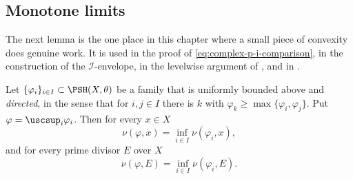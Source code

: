 \subsection{Monotone limits}
\label{sec:ch51-lelong-monotone}

The next lemma is the one place in this chapter where a small piece of
convexity does genuine work.  It is used in the proof of
\eqref{eq:complex-p-i-comparison}, in the construction of the
\(\mathcal I\)-envelope, in the levelwise argument of
, and in .

\begin{lemma}
\label{lem:ch51-lelong-increasing}
Let \(\{\varphi_i\}_{i\in I}\subset\PSH(X,\theta)\) be a family that is
uniformly bounded above and \emph{directed}, in the sense that for
\(i,j\in I\) there is \(k\) with \(\varphi_k\geq\max\{\varphi_i,
\varphi_j\}\).  Put \(\varphi=\uscsup_i\varphi_i\).  Then for every
\(x\in X\)
\[
 \nu(\varphi,x)=\inf_{i\in I}\nu(\varphi_i,x),
\]
and for every prime divisor \(E\) over \(X\)
\[
 \nu(\varphi,E)=\inf_{i\in I}\nu(\varphi_i,E).
\]
\end{lemma}

